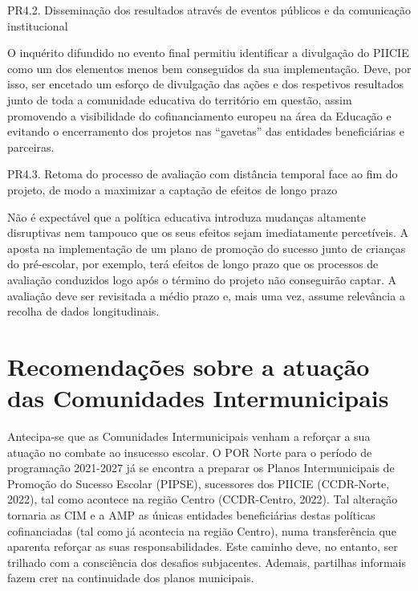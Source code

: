 \documentclass[
]{book}
\begin{document}
\leavevmode{}%
PR4.2. Disseminação dos resultados através de eventos públicos e da comunicação institucional

O inquérito difundido no evento final permitiu identificar a divulgação do PIICIE como um dos elementos menos bem conseguidos da sua implementação. Deve, por isso, ser encetado um esforço de divulgação das ações e dos respetivos resultados junto de toda a comunidade educativa do território em questão, assim promovendo a visibilidade do cofinanciamento europeu na área da Educação e evitando o encerramento dos projetos nas ``gavetas'' das entidades beneficiárias e parceiras.

\leavevmode{}%
PR4.3. Retoma do processo de avaliação com distância temporal face ao fim do projeto, de modo a maximizar a captação de efeitos de longo prazo

Não é expectável que a política educativa introduza mudanças altamente disruptivas nem tampouco que os seus efeitos sejam imediatamente percetíveis. A aposta na implementação de um plano de promoção do sucesso junto de crianças do pré-escolar, por exemplo, terá efeitos de longo prazo que os processos de avaliação conduzidos logo após o término do projeto não conseguirão captar. A avaliação deve ser revisitada a médio prazo e, mais uma vez, assume relevância a recolha de dados longitudinais.

\hypertarget{recomendauxe7uxf5es-sobre-a-atuauxe7uxe3o-das-comunidades-intermunicipais}{%
\section{\texorpdfstring{\textbf{Recomendações sobre a atuação das Comunidades Intermunicipais}}{Recomendações sobre a atuação das Comunidades Intermunicipais}}\label{recomendauxe7uxf5es-sobre-a-atuauxe7uxe3o-das-comunidades-intermunicipais}}

Antecipa-se que as Comunidades Intermunicipais venham a reforçar a sua atuação no combate ao insucesso escolar. O POR Norte para o período de programação 2021-2027 já se encontra a preparar os Planos Intermunicipais de Promoção do Sucesso Escolar (PIPSE), sucessores dos PIICIE (CCDR-Norte, 2022), tal como acontece na região Centro (CCDR-Centro, 2022). Tal alteração tornaria as CIM e a AMP as únicas entidades beneficiárias destas políticas cofinanciadas (tal como já acontecia na região Centro), numa transferência que aparenta reforçar as suas responsabilidades. Este caminho deve, no entanto, ser trilhado com a consciência dos desafios subjacentes. Ademais, partilhas informais fazem crer na continuidade dos planos municipais.
\end{document}
